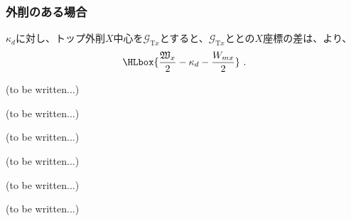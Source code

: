 \clearpage
\subsubsection{外削のある場合}
\AsideKeywayDepth$\kappa_d$に対し、トップ外削$X$中心を$\mathcal G_{\mathrm Tx}$とすると、$\mathcal G_{\mathrm Tx}$と\KeywayCenter との$X$座標の差は、より、
\begin{align*}
  \HLbox{\frac{\mathfrak W_x}2-\kappa_d-\frac{W_{mx}}2}\ .
\end{align*}



\clearpage
(to be written...)



(to be written...)



(to be written...)



(to be written...)


(to be written...)



\clearpage
(to be written...)
